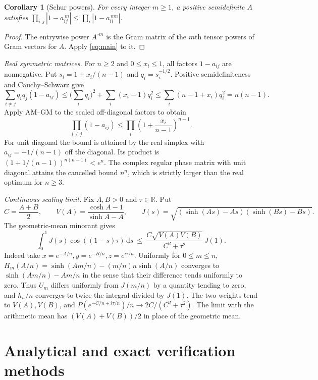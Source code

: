 \documentclass[10pt,twoside,reqno]{amsart}
\newtheorem{corollary}[theorem]{Corollary}
\numberwithin{equation}{section}
\newcommand{\dd}{\,\mathrm{d}}
\begin{document}
\begin{corollary}[Schur powers]
For every integer \(m\ge1\), a positive semidefinite \(A\) satisfies
\(\prod_{i,j}|1-a_{ij}^{\,m}|\le\prod_i|1-a_{ii}^{\,mn}|\).
\end{corollary}

\begin{proof}
The entrywise power \(A^{\circ m}\) is the Gram matrix of the \(m\)th
tensor powers of Gram vectors for \(A\). Apply \eqref{eq:main} to it.
\end{proof}

\medskip
\noindent
\textit{Real symmetric matrices.}
For \(n\ge2\) and \(0\le x_i\le1\), all factors \(1-a_{ij}\) are
nonnegative. Put \(s_i=1+x_i/(n-1)\) and \(q_i=s_i^{-1/2}\).
Positive semidefiniteness and Cauchy--Schwarz give
\[
 \sum_{i\ne j}q_iq_j(1-a_{ij})
 \le \Big(\sum_iq_i\Big)^2+\sum_i(x_i-1)q_i^2
 \le\sum_i(n-1+x_i)q_i^2=n(n-1).
\]
Apply AM--GM to the scaled off-diagonal factors to obtain
\[
 \prod_{i\ne j}(1-a_{ij})
 \le \prod_i\left(1+\frac{x_i}{n-1}\right)^{n-1}.
\]
For unit diagonal the bound is attained by the real simplex with
\(a_{ij}=-1/(n-1)\) off the diagonal. Its product is
\((1+1/(n-1))^{n(n-1)}<e^n\). The complex regular phase matrix with unit
diagonal attains the cancelled bound \(n^n\), which is strictly larger
than the real optimum for \(n\ge3\).

\medskip
\noindent
\textit{Continuous scaling limit.}
Fix \(A,B>0\) and \(\tau\in\mathbb R\). Put
\[
 C=\frac{A+B}{2},\qquad
 V(A)=\frac{\cosh A-1}{\sinh A-A},\qquad
 J(s)=\sqrt{(\sinh(As)-As)(\sinh(Bs)-Bs)} .
\]
The geometric-mean minorant gives
\begin{equation}\label{eq:limit}
 \int_0^1 J(s)\cos((1-s)\tau)\dd s
 \ \le\ \frac{C\sqrt{V(A)V(B)}}{C^2+\tau^2}\,J(1).
\end{equation}
Indeed take \(x=e^{-A/n}, y=e^{-B/n}, z=e^{i\tau/n}\).
Uniformly for \(0\le m\le n\),
\(H_m(A/n)=\sinh(Am/n)-(m/n)n\sinh(A/n)\)
converges to \(\sinh(Am/n)-Am/n\) in the sense that their difference tends
uniformly to zero. Thus \(U_m\) differs uniformly from \(J(m/n)\) by a
quantity tending to zero, and \(h_n/n\) converges to twice the integral
divided by \(J(1)\). The two weights tend to \(V(A),V(B)\), and
\(P(e^{-C/n+i\tau/n})/n\to 2C/(C^2+\tau^2)\).
The limit with the arithmetic mean has \((V(A)+V(B))/2\) in place of the
geometric mean.

\section{Analytical and exact verification methods}
\end{document}
